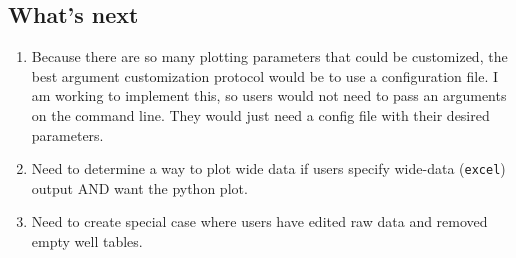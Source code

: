 \documentclass[12pt]{article}
\begin{document}
\subsection*{What's next}
\label{sec:org44c0d06}
\begin{enumerate}
\item Because there are so many plotting parameters that could be customized, the best argument customization protocol would be to use a configuration file. I am working to implement this, so users would not need to pass an arguments on the command line. They would just need a config file with their desired parameters.
\item Need to determine a way to plot wide data if users specify wide-data (\texttt{excel}) output AND want the python plot.
\item Need to create special case where users have edited raw data and removed empty well tables.
\end{enumerate}
\end{document}
